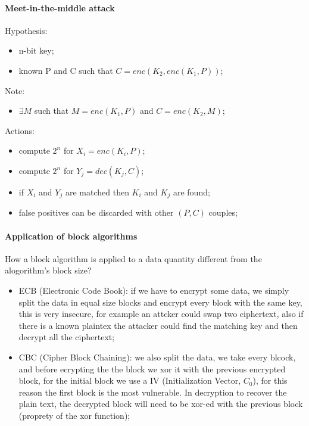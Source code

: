 \documentclass[12pt]{article}
\begin{document}
\paragraph{Meet-in-the-middle attack}
Hypothesis:
\begin{itemize}
    \item n-bit key;
    \item known P and C such that $C = enc(K_2, enc(K_1, P))$;
\end{itemize}

Note:
\begin{itemize}
    \item $\exists M$ such that $M = enc(K_1, P)$ and $C = enc(K_2, M)$;
\end{itemize}

Actions:
\begin{itemize}
    \item compute $2^{n}$ for $X_i =enc(K_i, P)$;
    \item compute $2^{n}$ for $Y_j =dec(K_j, C)$;
    \item if $X_i$ and $Y_j$ are matched then $K_i$ and $K_j$ are found;
    \item false positives can be discarded with other $(P,C)$ couples;
\end{itemize}

\paragraph{Application of block algorithms}
How a block algorithm is applied to a data quantity different from the alogorithm's block size?
\begin{itemize}
    \item ECB (Electronic Code Book): if we have to encrypt some data, we simply split the data in equal size blocks and encrypt every block with the same key, this is very insecure, for example an attcker could swap two ciphertext, also if there is a known plaintex the attacker could find the matching key and then decrypt all the ciphertext;
    \item CBC (Cipher Block Chaining): we also split the data, we take every blcock, and before ecrypting the the block we xor it with the previous encrypted block, for the initial block we use a IV (Initialization Vector, $C_0$), for this reason the first block is the most vulnerable. In decryption to recover the plain text, the decrypted block will need to be xor-ed with the previous block (proprety of the xor function);
\end{itemize}
\end{document}

